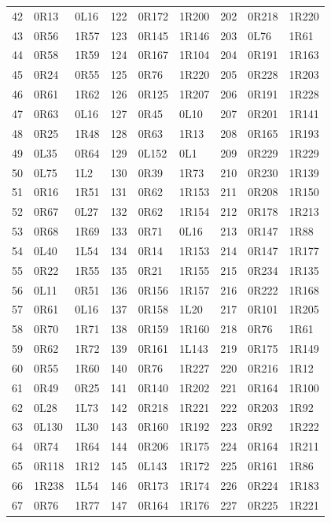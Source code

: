 \begin{longtable}{rll@{\hspace{1.3em}}rll@{\hspace{1.3em}}rll}
42 & 0R13 & 0L16 & 122 & 0R172 & 1R200 & 202 & 0R218 & 1R220 \\
43 & 0R56 & 1R57 & 123 & 0R145 & 1R146 & 203 & 0L76 & 1R61 \\
44 & 0R58 & 1R59 & 124 & 0R167 & 1R104 & 204 & 0R191 & 1R163 \\
45 & 0R24 & 0R55 & 125 & 0R76 & 1R220 & 205 & 0R228 & 1R203 \\
46 & 0R61 & 1R62 & 126 & 0R125 & 1R207 & 206 & 0R191 & 1R228 \\
47 & 0R63 & 0L16 & 127 & 0R45 & 0L10 & 207 & 0R201 & 1R141 \\
48 & 0R25 & 1R48 & 128 & 0R63 & 1R13 & 208 & 0R165 & 1R193 \\
49 & 0L35 & 0R64 & 129 & 0L152 & 0L1 & 209 & 0R229 & 1R229 \\
50 & 0L75 & 1L2 & 130 & 0R39 & 1R73 & 210 & 0R230 & 1R139 \\
51 & 0R16 & 1R51 & 131 & 0R62 & 1R153 & 211 & 0R208 & 1R150 \\
52 & 0R67 & 0L27 & 132 & 0R62 & 1R154 & 212 & 0R178 & 1R213 \\
53 & 0R68 & 1R69 & 133 & 0R71 & 0L16 & 213 & 0R147 & 1R88 \\
54 & 0L40 & 1L54 & 134 & 0R14 & 1R153 & 214 & 0R147 & 1R177 \\
55 & 0R22 & 1R55 & 135 & 0R21 & 1R155 & 215 & 0R234 & 1R135 \\
56 & 0L11 & 0R51 & 136 & 0R156 & 1R157 & 216 & 0R222 & 1R168 \\
57 & 0R61 & 0L16 & 137 & 0R158 & 1L20 & 217 & 0R101 & 1R205 \\
58 & 0R70 & 1R71 & 138 & 0R159 & 1R160 & 218 & 0R76 & 1R61 \\
59 & 0R62 & 1R72 & 139 & 0R161 & 1L143 & 219 & 0R175 & 1R149 \\
60 & 0R55 & 1R60 & 140 & 0R76 & 1R227 & 220 & 0R216 & 1R12 \\
61 & 0R49 & 0R25 & 141 & 0R140 & 1R202 & 221 & 0R164 & 1R100 \\
62 & 0L28 & 1L73 & 142 & 0R218 & 1R221 & 222 & 0R203 & 1R92 \\
63 & 0L130 & 1L30 & 143 & 0R160 & 1R192 & 223 & 0R92 & 1R222 \\
64 & 0R74 & 1R64 & 144 & 0R206 & 1R175 & 224 & 0R164 & 1R211 \\
65 & 0R118 & 1R12 & 145 & 0L143 & 1R172 & 225 & 0R161 & 1R86 \\
66 & 1R238 & 1L54 & 146 & 0R173 & 1R174 & 226 & 0R224 & 1R183 \\
67 & 0R76 & 1R77 & 147 & 0R164 & 1R176 & 227 & 0R225 & 1R221 \\

\end{longtable}
